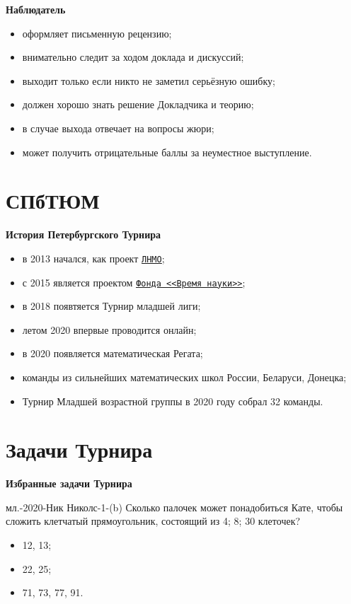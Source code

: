 \documentclass[11pt]{beamer}
\newcommand\fram[2]{\begin{frame}{\bf #1} #2 \end{frame}}
\newcommand{\myref}[2]{\href{#1}{\texttt{\underline{#2}}}}
\def\usl#1#2{\begin{block}{#1} #2 \end{block} \medskip\pause}
\begin{document}
\fram{Наблюдатель}{
\Large
\begin{itemize}
	\item оформляет письменную рецензию;
	\item внимательно следит за ходом \linebreak доклада и дискуссий;
	\item выходит только если никто не заметил серьёзную ошибку;
	\item должен хорошо знать решение \linebreak Докладчика  и теорию;
	\item в случае выхода отвечает на вопросы жюри;
	\item может получить отрицательные баллы за неуместное выступление.
\end{itemize}
}

\section{СПбТЮМ}
\fram{История Петербургского Турнира}{
\large

\begin{itemize}
	\item в 2013 начался, как проект \myref{https://lnmo.ru/}{ЛНМО};
	\item с 2015 является проектом \myref{https://timeforscience.ru/}{Фонда <<Время науки>>};
	\item в 2018 появтяется Турнир младшей лиги;
	\item летом 2020 впервые проводится онлайн;
	\item в 2020 появляется математическая Регата;
	\item команды из сильнейших математических школ России, Беларуси, Донецка;
	\item Турнир Младшей возрастной группы в 2020 году \linebreak собрал 32 команды.
\end{itemize}
}

\section{Задачи Турнира} %
\fram{Избранные задачи Турнира}{
\usl{мл.-2020-Ник Николс-1-(b)}{
Сколько палочек может понадобиться Кате, чтобы сложить клетчатый прямоугольник, состоящий из 4; 8; 30 клеточек?
}

\begin{itemize}
	\item 12, 13;
	\item 22, 25;
	\item 71, 73, 77, 91.
\end{itemize}
}
\end{document}
